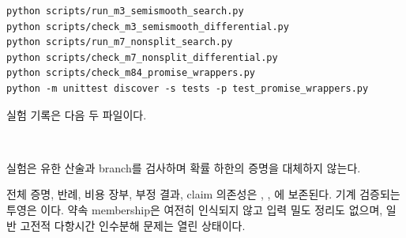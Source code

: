 \documentclass[11pt]{article}
\begin{document}
\begin{verbatim}
python scripts/run_m3_semismooth_search.py
python scripts/check_m3_semismooth_differential.py
python scripts/run_m7_nonsplit_search.py
python scripts/check_m7_nonsplit_differential.py
python scripts/check_m84_promise_wrappers.py
python -m unittest discover -s tests -p test_promise_wrappers.py
\end{verbatim}
실험 기록은 다음 두 파일이다.
\par\smallskip
\noindent\begin{minipage}{\linewidth}
\raggedright\small
{}\\
\end{minipage}
실험은 유한 산술과 branch를 검사하며 확률 하한의 증명을 대체하지 않는다.

전체 증명, 반례, 비용 장부, 부정 결과, claim 의존성은
\archivepaper{}, ,
에 보존된다. 기계 검증되는 투영은
이다. 약속 membership은
여전히 인식되지 않고 입력 밀도 정리도 없으며, 일반 고전적 다항시간
인수분해 문제는 열린 상태이다.


\small

\end{document}
